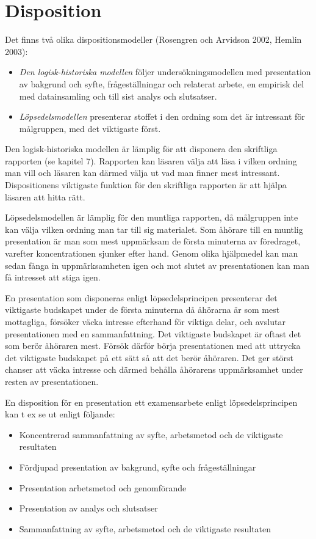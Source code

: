 \section{Disposition}\label{disposition}

Det finns två olika dispositionsmodeller (Rosengren och Arvidson 2002,
Hemlin 2003):

\begin{itemize}
\item
  \emph{Den logisk-historiska modellen} följer undersökningsmodellen med
  presentation av bakgrund och syfte, frågeställningar och relaterat
  arbete, en empirisk del med datainsamling och till sist analys och
  slutsatser.
\item
  \emph{Löpsedelsmodellen} presenterar stoffet i den ordning som det är
  intressant för målgruppen, med det viktigaste först.
\end{itemize}

Den logisk-historiska modellen är lämplig för att disponera den
skriftliga rapporten (se kapitel 7). Rapporten kan läsaren välja att
läsa i vilken ordning man vill och läsaren kan därmed välja ut vad man
finner mest intressant. Dispositionens viktigaste funktion för den
skriftliga rapporten är att hjälpa läsaren att hitta rätt.

Löpsedelsmodellen är lämplig för den muntliga rapporten, då målgruppen
inte kan välja vilken ordning man tar till sig materialet. Som åhörare
till en muntlig presentation är man som mest uppmärksam de första
minuterna av föredraget, varefter koncentrationen sjunker efter hand.
Genom olika hjälpmedel kan man sedan fånga in uppmärksamheten igen och
mot slutet av presentationen kan man få intresset att stiga igen.

En presentation som disponeras enligt löpsedelsprincipen presenterar det
viktigaste budskapet under de första minuterna då åhörarna är som mest
mottagliga, försöker väcka intresse efterhand för viktiga delar, och
avslutar presentationen med en sammanfattning. Det viktigaste budskapet
är oftast det som berör åhöraren mest. Försök därför börja
presentationen med att uttrycka det viktigaste budskapet på ett sätt så
att det berör åhöraren. Det ger störst chanser att väcka intresse och
därmed behålla åhörarens uppmärksamhet under resten av presentationen.

En disposition för en presentation ett examensarbete enligt
löpsedelsprincipen kan t ex se ut enligt följande:

\begin{itemize}
\item
  \protect\hypertarget{OLE_LINK21}{}{\protect\hypertarget{OLE_LINK11}{}{}}Koncentrerad
  sammanfattning av syfte, arbetsmetod och de viktigaste resultaten
\item
  Fördjupad presentation av bakgrund, syfte och frågeställningar
\item
  Presentation arbetsmetod och genomförande
\item
  Presentation av analys och slutsatser
\item
  Sammanfattning av syfte, arbetsmetod och de viktigaste resultaten
\end{itemize}

